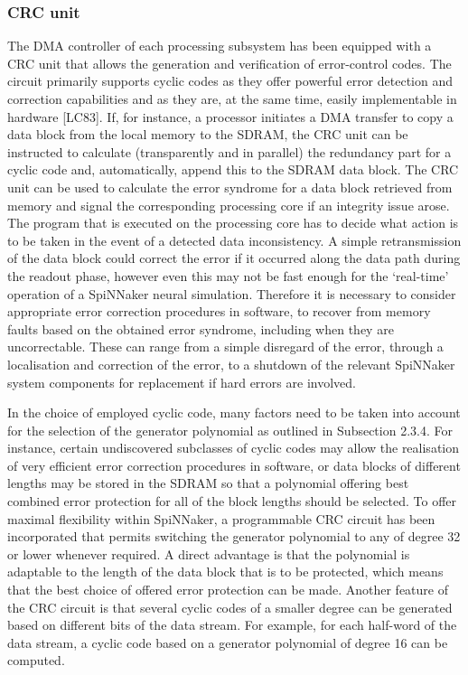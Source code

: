 \documentclass[a4paper, 11pt]{article}
\begin{document}
\subsubsection{CRC unit}
The DMA controller of each processing subsystem has been equipped with a CRC unit that allows the generation and verification of error-control codes. The circuit primarily supports cyclic codes as they offer powerful error detection and correction capabilities and as they are, at the same time, easily implementable in hardware [LC83]. If, for instance, a processor initiates a DMA transfer to copy a data block from the local memory to the SDRAM, the CRC unit can be instructed to calculate (transparently and in parallel) the redundancy part for a cyclic code and, automatically, append this to the SDRAM data block. The CRC unit can be used to calculate the error syndrome for a data block retrieved from memory and signal the corresponding processing core if an integrity issue arose. The program that is executed on the processing core has to decide what action is to be taken in the event of a detected data inconsistency. A simple retransmission of the data block could correct the error if it occurred along the data path during the readout phase, however even this may not be fast enough for the `real-time' operation of a SpiNNaker neural simulation. Therefore it is necessary to consider appropriate error correction procedures in software, to recover from memory faults based on the obtained error syndrome, including when they are uncorrectable. These can range from a simple disregard of the error, through a localisation and correction of the error, to a shutdown of the relevant SpiNNaker system components for replacement if hard errors are involved.

In the choice of employed cyclic code, many factors need to be taken into account for the selection of the generator polynomial as outlined in Subsection 2.3.4. For instance, certain undiscovered subclasses of cyclic codes may allow the realisation of very efficient error correction procedures in software, or data blocks of different lengths may be stored in the SDRAM so that a polynomial offering best combined error protection for all of the block lengths should be selected. To offer maximal flexibility within SpiNNaker, a programmable CRC circuit has been incorporated that permits switching the generator polynomial to any of degree 32 or lower whenever required. A direct advantage is that the polynomial is adaptable to the length of the data block that is to be protected, which means that the best choice of offered error protection can be made. Another feature of the CRC circuit is that several cyclic codes of a smaller degree can be generated based on different bits of the data stream. For example, for each half-word of the data stream, a cyclic code based on a generator polynomial of degree 16 can be computed.
\end{document}
